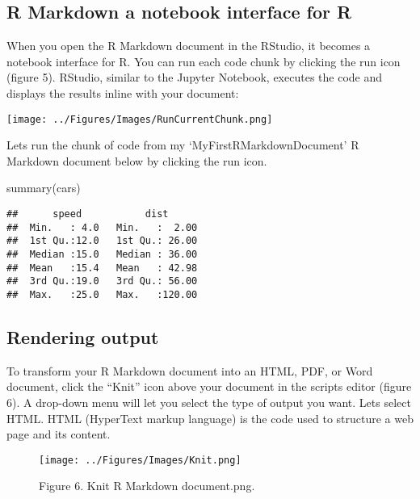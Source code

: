 \documentclass[
]{article}
\newenvironment{Shaded}{\begin{snugshade}}{\end{snugshade}}
\newcommand{\FunctionTok}[1]{\textcolor[rgb]{0.00,0.00,0.00}{#1}}
\newcommand{\NormalTok}[1]{#1}
\begin{document}
\hypertarget{r-markdown-a-notebook-interface-for-r}{%
\subsection{\texorpdfstring{\textbf{R Markdown a notebook interface for
R}}{R Markdown a notebook interface for R}}\label{r-markdown-a-notebook-interface-for-r}}

When you open the R Markdown document in the RStudio, it becomes a
notebook interface for R. You can run each code chunk by clicking the
run icon (figure 5). RStudio, similar to the Jupyter Notebook, executes
the code and displays the results inline with your document:

\texttt{[image: ../Figures/Images/RunCurrentChunk.png]}

Lets run the chunk of code from my `MyFirstRMarkdownDocument' R Markdown
document below by clicking the run icon.

\begin{Shaded}
\begin{Highlighting}[]
\FunctionTok{summary}\NormalTok{(cars)}
\end{Highlighting}
\end{Shaded}

\begin{verbatim}
##      speed           dist       
##  Min.   : 4.0   Min.   :  2.00  
##  1st Qu.:12.0   1st Qu.: 26.00  
##  Median :15.0   Median : 36.00  
##  Mean   :15.4   Mean   : 42.98  
##  3rd Qu.:19.0   3rd Qu.: 56.00  
##  Max.   :25.0   Max.   :120.00
\end{verbatim}

\hypertarget{rendering-output}{%
\subsection{\texorpdfstring{\textbf{Rendering
output}}{Rendering output}}\label{rendering-output}}

To transform your R Markdown document into an HTML, PDF, or Word
document, click the ``Knit'' icon above your document in the scripts
editor (figure 6). A drop-down menu will let you select the type of
output you want. Lets select HTML. HTML (HyperText markup language) is
the code used to structure a web page and its content.

\begin{figure}
\centering
\texttt{[image: ../Figures/Images/Knit.png]}
\caption{Figure 6. Knit R Markdown document.png.}
\end{figure}
\end{document}
